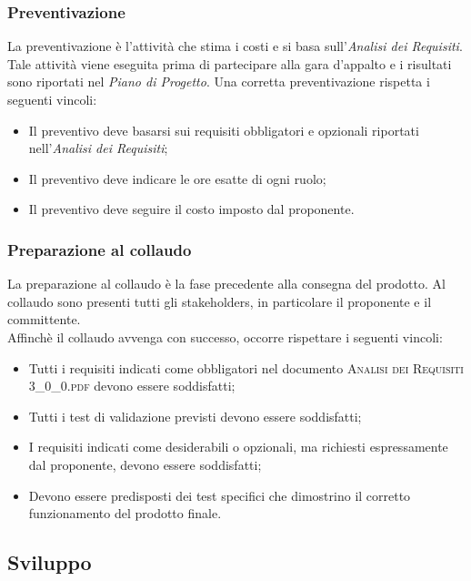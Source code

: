 		\subsubsection{Preventivazione}
		La preventivazione è l'attività che stima i costi e si basa sull'\textit{Analisi dei Requisiti}.\\ Tale attività viene eseguita prima di partecipare alla gara d'appalto e i risultati sono riportati nel \textit{Piano di Progetto}. Una corretta preventivazione rispetta i seguenti vincoli:
		\begin{itemize}
			\item Il preventivo deve basarsi sui requisiti obbligatori e opzionali riportati nell'\textit{Analisi dei Requisiti};
			\item Il preventivo deve indicare le ore esatte di ogni ruolo;
			\item  Il preventivo deve seguire il costo imposto dal proponente.
		\end{itemize}
	
		\subsubsection{Preparazione al collaudo}
		La preparazione al collaudo è la fase precedente alla consegna del prodotto. Al collaudo sono presenti tutti gli stakeholders, in particolare il proponente e il committente.\\
		Affinchè il collaudo avvenga con successo, occorre rispettare i seguenti vincoli:
		\begin{itemize}
			\item Tutti i requisiti indicati come obbligatori nel documento \textsc{Analisi dei Requisiti 3\_0\_0.pdf} devono essere soddisfatti;
			\item Tutti i test di validazione previsti devono essere soddisfatti;
			\item I requisiti indicati come desiderabili o opzionali, ma richiesti espressamente dal proponente, devono essere soddisfatti;
			\item Devono essere predisposti dei test specifici che dimostrino il corretto funzionamento del prodotto finale.
		\end{itemize}
		
		
	\newpage
	\subsection{Sviluppo}
